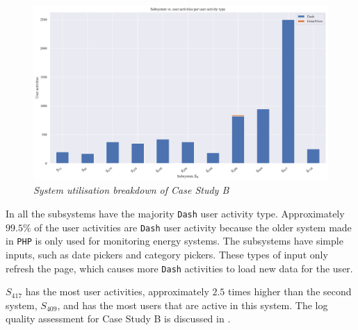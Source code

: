 \begin{figure}[!htb]
	\centering %
	\includegraphics[width=0.95\linewidth]{img/ch3/analysis/case_B_subsystems_1.pdf}
	\caption[System utilisation breakdown of Case Study B]
	{\textit{System utilisation breakdown of Case Study B}}\label{fig:ch3_caseBAnalysis}
\end{figure} 

In  all the subsystems have the majority \texttt{Dash} user activity type. Approximately $99.5\%$ of the user activities are \texttt{Dash} user activity because the older system made in \texttt{PHP} is only used for monitoring energy systems. The subsystems have simple inputs, such as date pickers and category pickers. These types of input only refresh the page, which causes more \texttt{Dash} activities to load new data for the user. \par $S_{417}$ has the most user activities, approximately $2.5$ times higher than the second system, $S_{409}$, and has the most users that are active in this system. The log quality assessment for Case Study B is discussed in .


